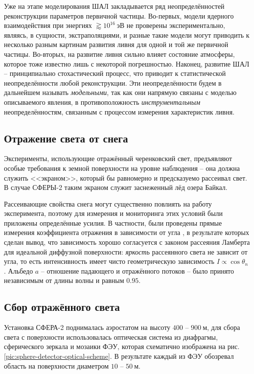 Уже на этапе моделирования ШАЛ закладывается ряд неопределённостей реконструкции параметров первичной частицы. Во-первых, модели ядерного взаимодействия при энергиях $\gtrapprox 10^{16}~\text{эВ}$ не проверены экспериментально, являясь, в сущности, экстраполяциями, и разные такие модели могут приводить к несколько разным картинам развития ливня для одной и той же первичной частицы. Во-вторых, на развитие ливня сильно влияет состояние атмосферы, которое тоже известно лишь с некоторой погрешностью. Наконец, развитие ШАЛ -- принципиально стохастический процесс, что приводит к статистической неопределённости любой реконструкции. Эти неопределённости будем в дальнейшем называть \textit{модельными}, так как они напрямую связаны с моделью описываемого явления, в противоположность \textit{инструментальным} неопределённостям, связанным с процессом измерения характеристик ливня.

\subsection{Отражение света от снега}
\label{sect:snow-reflection}

Эксперименты, использующие отражённый черенковский свет, предъявляют особые требования к земной поверхности на уровне наблюдения -- она должна служить <<экраном>>, который бы равномерно и предсказуемо рассеивал свет. В случае СФЕРЫ-2 таким экраном служит заснеженный лёд озера Байкал.

Рассеивающие свойства снега могут существенно повлиять на работу эксперимента, поэтому для измерения и мониторинга этих условий были приложены определённые усилия. В частности, были проведены прямые измерения коэффициента отражения в зависимости от угла \cite[рис.~11]{Sphere2015}, в результате которых сделан вывод, что зависимость хорошо согласуется с законом рассеяния Ламберта для идеальной диффузной поверхности: \textit{яркость} рассеянного света не зависит от угла, то есть интенсивность имеет чисто геометрическую зависимость $I \propto \cos \theta_n$ \cite{Antonov2019}. Альбедо $a$ -- отношение падающего и отражённого потоков -- было принято независимым от длины волны \cite{Warren1982} и равным $0.95$.

\subsection{Сбор отражённого света}
\label{sec:light-collection-from-surface}

Установка СФЕРА-2 поднималась аэростатом на высоту $400$ -- $900~\text{м}$, для сбора света с поверхности использовалась оптическая система из диафрагмы, сферического зеркала и мозаики ФЭУ, которая схематично изображена на рис. \ref{pic:sphere-detector-optical-scheme}. В результате каждый из ФЭУ обозревал область на поверхности диаметром $10$ -- $50~\text{м}$.

